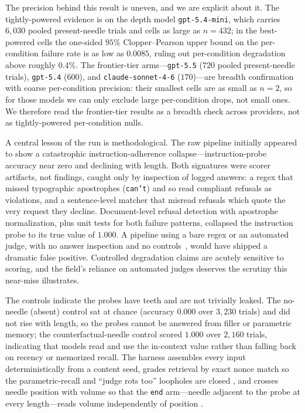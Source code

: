 \documentclass[11pt]{article}
\begin{document}
The precision behind this result is uneven, and we are explicit about it. The tightly-powered evidence is on the depth model \texttt{gpt-5.4-mini}, which carries $6{,}030$ pooled present-needle trials and cells as large as $n=432$; in the best-powered cells the one-sided $95\%$ Clopper--Pearson upper bound on the per-condition failure rate is as low as $0.0085$, ruling out per-condition degradation above roughly $0.4\%$. The frontier-tier arms---\texttt{gpt-5.5} ($720$ pooled present-needle trials), \texttt{gpt-5.4} ($600$), and \texttt{claude-sonnet-4-6} ($170$)---are breadth confirmation with coarse per-condition precision: their smallest cells are as small as $n=2$, so for those models we can only exclude large per-condition drops, not small ones. We therefore read the frontier-tier results as a breadth check across providers, not as tightly-powered per-condition nulls.

A central lesson of the run is methodological. The raw pipeline initially appeared to show a catastrophic instruction-adherence collapse---instruction-probe accuracy near zero and declining with length. Both signatures were scorer artifacts, not findings, caught only by inspection of logged answers: a regex that missed typographic apostrophes (\texttt{can't}) and so read compliant refusals as violations, and a sentence-level matcher that misread refusals which quote the very request they decline. Document-level refusal detection with apostrophe normalization, plus unit tests for both failure patterns, collapsed the instruction probe to its true value of $1.000$. A pipeline using a bare regex or an automated judge, with no answer inspection and no controls~\cite{zheng2023judge}, would have shipped a dramatic false positive. Controlled degradation claims are acutely sensitive to scoring, and the field's reliance on automated judges deserves the scrutiny this near-miss illustrates.

The controls indicate the probes have teeth and are not trivially leaked. The no-needle (absent) control sat at chance (accuracy $0.000$ over $3{,}230$ trials) and did not rise with length, so the probes cannot be answered from filler or parametric memory; the counterfactual-needle control scored $1.000$ over $2{,}160$ trials, indicating that models read and use the in-context value rather than falling back on recency or memorized recall. The harness assembles every input deterministically from a content seed, grades retrieval by exact nonce match so the parametric-recall and ``judge rots too'' loopholes are closed \cite{kamradt2023niah, zheng2023judge}, and crosses needle position with volume so that the \texttt{end} arm---needle adjacent to the probe at every length---reads volume independently of position \cite{liu2024lostmiddle}.
\end{document}
